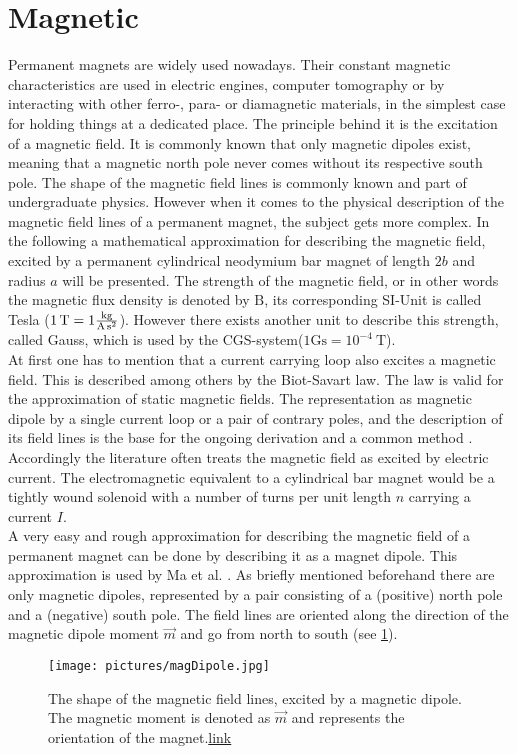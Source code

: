 \section{Magnetic} \label{sec:magneticFound}
Permanent magnets are widely used nowadays. Their constant magnetic characteristics are used in electric engines, computer tomography or by interacting with other ferro-, para- or diamagnetic materials, in the simplest case for holding things at a dedicated place. The principle behind it is the excitation of a magnetic field. It is commonly known that only magnetic dipoles exist, meaning that a magnetic north pole never comes without its respective south pole. The shape of the magnetic field lines is commonly known and part of undergraduate physics. However when it comes to the physical description of the magnetic field lines of a permanent magnet, the subject gets more complex. In the following a mathematical approximation for describing the magnetic field, excited by a permanent cylindrical neodymium bar magnet of length $ 2b $ and radius $ a $ will be presented. The strength of the magnetic field, or in other words the magnetic flux density is denoted by $ \mathrm{B} $, its corresponding SI-Unit is called Tesla ($ \SI{1}{\tesla} = 1 \si[per-mode=fraction]{\kilogram \per \ampere \per \second \squared} $). However there exists another unit to describe this strength, called Gauss, which is used by the CGS-system($ 1 \mathrm{Gs} = 10^{-4}\SI{}{\tesla} $). \\
At first one has to mention that a current carrying loop also excites a magnetic field. This is described among others by the Biot-Savart law. The law is valid for the approximation of static magnetic fields. The representation as magnetic dipole by a single current loop or a pair of contrary poles, and the description of its field lines is the base for the ongoing derivation and a common method \cite{derby2010cylindrical}. Accordingly the literature often treats the magnetic field as excited by electric current. The electromagnetic equivalent to a cylindrical bar magnet would be a tightly wound solenoid with a number of turns per unit length $ n $ carrying a current $ I $.\\
A very easy and rough approximation for describing the magnetic field of a permanent magnet can be done by describing it as a magnet dipole. This approximation is used by Ma et al. \cite{ma2010magnetic}. As briefly mentioned beforehand there are only magnetic dipoles, represented by a pair consisting of a (positive) north pole and a (negative) south pole. The field lines are oriented along the direction of the magnetic dipole moment $ \vec{m} $ and go from north to south (see \ref{fig:magDipole}). %
\begin{figure}
\centering
\label{fig:magDipole}
\texttt{[image: pictures/magDipole.jpg]}
\caption{The shape of the magnetic field lines, excited by a magnetic dipole. The magnetic moment is denoted as $ \vec{m} $ and represents the orientation of the magnet.\href{http://cdn1.askiitians.com/Images/201529-161356533-148-download.jpg}{link}}
\end{figure}

